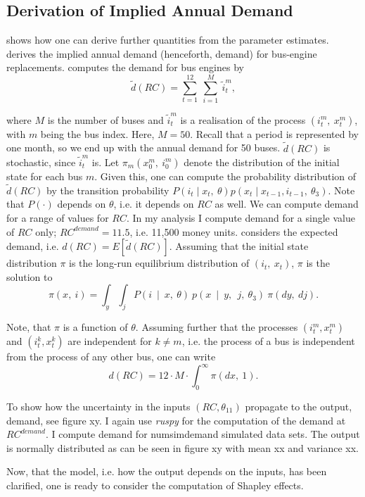 \subsection{Derivation of Implied Annual Demand}

\citet{R87} shows how one can derive further quantities from the parameter estimates. \citet{R87} derives the implied annual demand (henceforth, demand) for bus-engine replacements. \citet{R87} computes the demand for bus engines by
\begin{equation}
\tilde{d}(RC)=\sum_{t=1}^{12}\ \sum_{i=1}^{M}\ {\tilde{i}}_t^m,
\end{equation}

\noindent where $M$ is the number of buses and ${\tilde{i}}_t^m$ is a realisation of the process $(i_t^m,\ x_t^m)$, with $m$ being the bus index. Here, $M=50$. Recall that a period is represented by one month, so we end up with the annual demand for 50 buses. $\tilde{d}(RC)$ is stochastic, since ${\tilde{i}}_t^m$ is. Let $\pi_m(x_0^m,\ i_0^m)$ denote the distribution of the initial state for each bus $m$. Given this, one can compute the probability distribution of $\tilde{d}(RC) $ by the transition probability $P(i_t \mid x_t,\ \theta)p(x_t \mid x_{t-1}, i_{t-1},\ \theta_3) $. Note that $P(\cdot)$ depends on $\theta$, i.e. it depends on $RC$ as well. We can compute demand for a range of values for $RC$. In my analysis I compute demand for a single value of $RC$ only; $RC^{demand}=11.5$, i.e. 11,500 money units. \citet{R87} considers the expected demand, i.e. $d(RC)=E[\tilde{d}(RC)]$. Assuming that the initial state distribution $\pi$ is the long-run equilibrium distribution of $(i_t,\ x_t)$, $\pi$ is the solution to
\begin{equation}
\pi(x,\ i)=\int_y \int_j P(i\ \mid\ x,\ \theta)\ p(x\ \mid\ y,\ \ j,\ \theta_3)\ \pi(dy,\ dj).
\end{equation}

Note, that $\pi$ is a function of $\theta$. Assuming further that the processes $ (i_t^m, x_t^m)$ and $(i_t^k, x_t^k)$ are independent for $k \neq m$, i.e. the process of a bus is independent from the process of any other bus, one can write
\begin{equation}
d(RC)=12 \cdot M \cdot \int_0^{\infty} \pi(dx,\ 1).
\end{equation}

To show how the uncertainty in the inputs $(RC, \theta_{11})$ propagate to the output, demand, see figure xy. I again use \textit{ruspy} for the computation of the demand at $RC^{demand}$. I compute demand for numsimdemand simulated data sets. The output is normally distributed as can be seen in figure xy with mean xx and variance xx.

Now, that the model, i.e. how the output depends on the inputs, has been clarified, one is ready to consider the computation of Shapley effects.
